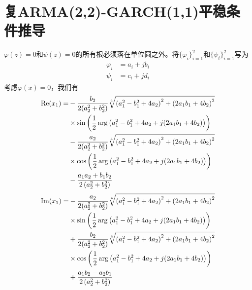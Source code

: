 
\chapter{复ARMA(2,2)-GARCH(1,1)平稳条件推导}
\echapter{**}

$\varphi (z)=0$和$\psi (z)=0$的所有根必须落在单位圆之外。将$\{ {\varphi _i}\} _{i = 1}^2$和$\{ {\psi _i}\} _{i = 1}^2$写为
\begin{align}
{\varphi _i} &= {a_i} + j{b_i} \label{eq:e1} \\
{\psi _i} &= {c_i} + j{d_i} \label{eq:e2}
\end{align}
考虑$\varphi (x)=0$，我们有
\begin{align}
{\mathop{\rm Re}\nolimits} ({x_1}) =&  - \frac{{{b_2}}}{{2(a_2^2 + b_2^2)}}\sqrt[4]{{{{\left( {a_1^2 - b_1^2 + 4{a_2}} \right)}^2} + {{\left( {2{a_1}{b_1} + 4{b_2}} \right)}^2}}} \notag \\
& \times \sin \left( {\frac{1}{2}\arg \left( {a_1^2 - b_1^2 + 4{a_2} + j(2{a_1}{b_1} + 4{b_2})} \right)} \right) \notag \\
& - \frac{{{a_2}}}{{2(a_2^2 + b_2^2)}}\sqrt[4]{{{{\left( {a_1^2 - b_1^2 + 4{a_2}} \right)}^2} + {{\left( {2{a_1}{b_1} + 4{b_2}} \right)}^2}}} \notag \\
& \times \cos \left( {\frac{1}{2}\arg \left( {a_1^2 - b_1^2 + 4{a_2} + j(2{a_1}{b_1} + 4{b_2})} \right)} \right) \notag \\
& - \frac{{{a_1}{a_2} + {b_1}{b_2}}}{{2\left( {a_2^2 + b_2^2} \right)}}  \label{eq:e3}
\end{align}
\begin{align}
{\mathop{\rm Im}\nolimits} ({x_1}) =&  - \frac{{{a_2}}}{{2(a_2^2 + b_2^2)}}\sqrt[4]{{{{\left( {a_1^2 - b_1^2 + 4{a_2}} \right)}^2} + {{\left( {2{a_1}{b_1} + 4{b_2}} \right)}^2}}} \notag \\
& \times \sin \left( {\frac{1}{2}\arg \left( {a_1^2 - b_1^2 + 4{a_2} + j(2{a_1}{b_1} + 4{b_2})} \right)} \right) \notag \\
& + \frac{{{b_2}}}{{2(a_2^2 + b_2^2)}}\sqrt[4]{{{{\left( {a_1^2 - b_1^2 + 4{a_2}} \right)}^2} + {{\left( {2{a_1}{b_1} + 4{b_2}} \right)}^2}}} \notag \\
& \times \cos \left( {\frac{1}{2}\arg \left( {a_1^2 - b_1^2 + 4{a_2} + j(2{a_1}{b_1} + 4{b_2})} \right)} \right) \notag \\
& + \frac{{{a_1}{b_2} - {a_2}{b_1}}}{{2\left( {a_2^2 + b_2^2} \right)}}  \label{eq:e4}
\end{align}
